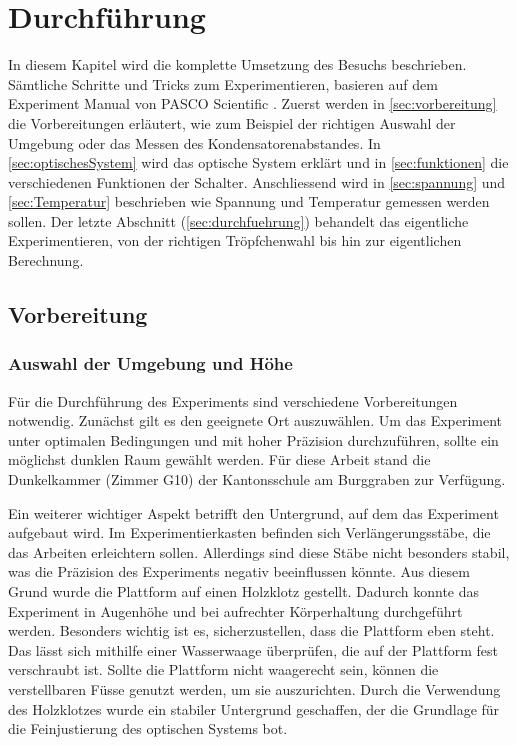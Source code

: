\chapter{Durchführung}\label{cha:durchfuehrung}
In diesem Kapitel wird die komplette Umsetzung des Besuchs beschrieben. Sämtliche Schritte und Tricks zum Experimentieren, basieren auf dem Experiment Manual von PASCO Scientific \parencite{instructionManualHalogen}. Zuerst werden in \autoref{sec:vorbereitung} die Vorbereitungen erläutert, wie zum Beispiel der richtigen Auswahl der Umgebung oder das Messen des Kondensatorenabstandes. In \autoref{sec:optischesSystem} wird das optische System erklärt und in \autoref{sec:funktionen} die verschiedenen Funktionen der Schalter. Anschliessend wird in \autoref{sec:spannung} und \autoref{sec:Temperatur} beschrieben wie Spannung und Temperatur gemessen werden sollen. Der letzte Abschnitt (\autoref{sec:durchfuehrung}) behandelt das eigentliche Experimentieren, von der richtigen Tröpfchenwahl bis hin zur eigentlichen Berechnung.

\section{Vorbereitung}\label{sec:vorbereitung}
\subsection{Auswahl der Umgebung und Höhe}\label{sub:auswahlUmgebung}
Für die Durchführung des Experiments sind verschiedene Vorbereitungen notwendig. Zunächst gilt es den geeignete Ort auszuwählen. Um das Experiment unter optimalen Bedingungen und mit hoher Präzision durchzuführen, sollte ein möglichst dunklen Raum gewählt werden. Für diese Arbeit stand die Dunkelkammer (Zimmer G10) der Kantonsschule am Burggraben zur Verfügung.

Ein weiterer wichtiger Aspekt betrifft den Untergrund, auf dem das Experiment aufgebaut wird. Im Experimentierkasten befinden sich Verlängerungsstäbe, die das Arbeiten erleichtern sollen. Allerdings sind diese Stäbe nicht besonders stabil, was die Präzision des Experiments negativ beeinflussen könnte. Aus diesem Grund wurde die Plattform auf einen Holzklotz gestellt. Dadurch konnte das Experiment in Augenhöhe und bei aufrechter Körperhaltung durchgeführt werden. Besonders wichtig ist es, sicherzustellen, dass die Plattform eben steht. Das lässt sich mithilfe einer Wasserwaage überprüfen, die auf der Plattform fest verschraubt ist. Sollte die Plattform nicht waagerecht sein, können die verstellbaren Füsse genutzt werden, um sie auszurichten. Durch die Verwendung des Holzklotzes wurde ein stabiler Untergrund geschaffen, der die Grundlage für die Feinjustierung des optischen Systems bot.

